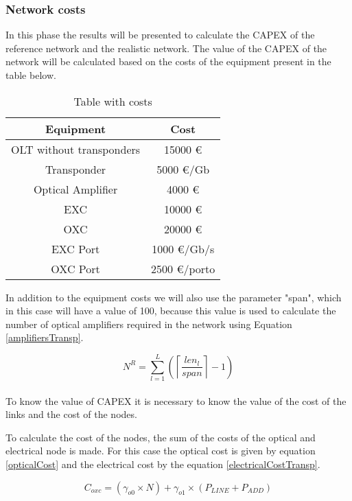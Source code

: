 \subsubsection{Network costs}

In this phase the results will be presented to calculate the CAPEX of the reference network and the realistic network.
The value of the CAPEX of the network will be calculated based on the costs of the equipment present in the table below. \\

\begin{table}[h!]
\centering
\begin{tabular}{|| c | c||}
 \hline
 Equipment & Cost \\
 \hline\hline
 OLT without transponders & 15000 \euro \\
 Transponder & 5000 \euro/Gb \\
 Optical Amplifier & 4000 \euro \\
 EXC & 10000 \euro \\
 OXC & 20000 \euro \\
 EXC Port & 1000 \euro /Gb/s\\
 OXC Port & 2500 \euro /porto \\
 \hline
\end{tabular}
\caption{Table with costs}
\label{table_cost2}
\end{table}

In addition to the equipment costs we will also use the parameter "span", which in this case will have a value of 100, because this value is used to calculate the number of optical amplifiers required in the network using Equation \ref{amplifiersTransp}.

\begin{equation}
N^R = \sum\limits_{l=1}^L\left(\left\lceil\frac{len_l}{span}\right\rceil-1\right)
\label{amplifiersTransp}
\end{equation} \\

To know the value of CAPEX it is necessary to know the value of the cost of the links and the cost of the nodes.

To calculate the cost of the nodes, the sum of the costs of the optical and electrical node is made. For this case the optical cost is given by equation \ref{opticalCost} and the electrical cost by the equation \ref{electricalCostTransp}.


\begin{equation}
C_{oxc} = \left(\gamma_{o0} \times N \right) + \gamma_{o1} \times  \left(P_{LINE} + P_{ADD}\right)
\label{opticalCost}
\end{equation}	
	
